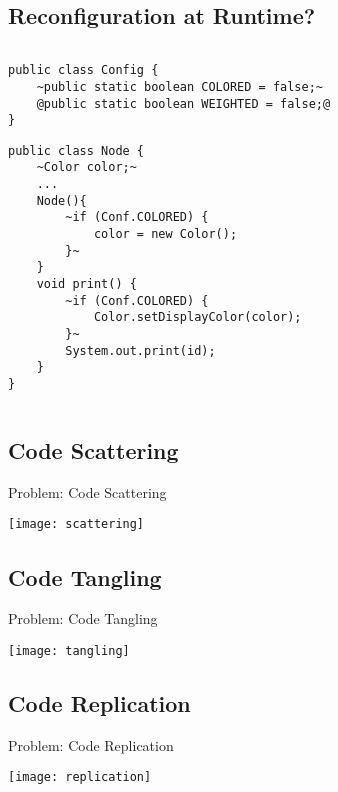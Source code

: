 \subsection{Reconfiguration at Runtime?}
\begin{frame}[fragile]{\myframetitle}
		\begin{columns}
\begin{tiny}
\begin{lstlisting}
public class Config {
	~public static boolean COLORED = false;~
	@public static boolean WEIGHTED = false;@
}

\end{lstlisting}
\begin{lstlisting}
public class Node {
	~Color color;~
	...
	Node(){
		~if (Conf.COLORED) { 
			color = new Color(); 
		}~
	}
	void print() {
		~if (Conf.COLORED) { 
			Color.setDisplayColor(color); 
		}~
		System.out.print(id);
	}
}
\end{lstlisting}
\end{tiny}	
		\end{columns}
\end{frame}

\subsection{Code Scattering}
\begin{frame}{Problem: Code Scattering}
	\begin{center}
		\vspace{-2mm}
		\texttt{[image: scattering]}
	\end{center}
\end{frame}

\subsection{Code Tangling}
\begin{frame}{Problem: Code Tangling}
	\begin{center}
		\vspace{-2mm}
		\texttt{[image: tangling]}
	\end{center}
\end{frame}

\subsection{Code Replication}
\begin{frame}{Problem: Code Replication}
	\begin{center}
		\vspace{-2mm}
		\texttt{[image: replication]}
	\end{center}
\end{frame}